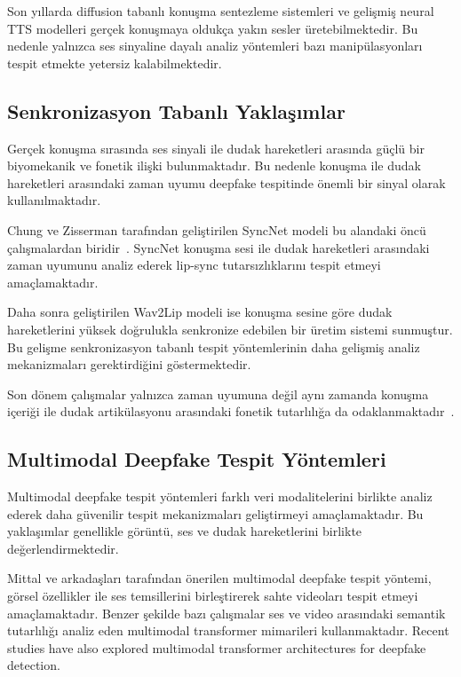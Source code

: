 \documentclass[conference]{IEEEtran}
\begin{document}
Son yıllarda diffusion tabanlı konuşma sentezleme sistemleri ve gelişmiş neural TTS modelleri gerçek konuşmaya oldukça yakın sesler üretebilmektedir. Bu nedenle yalnızca ses sinyaline dayalı analiz yöntemleri bazı manipülasyonları tespit etmekte yetersiz kalabilmektedir.

\subsection{Senkronizasyon Tabanlı Yaklaşımlar}

Gerçek konuşma sırasında ses sinyali ile dudak hareketleri arasında güçlü bir biyomekanik ve fonetik ilişki bulunmaktadır. Bu nedenle konuşma ile dudak hareketleri arasındaki zaman uyumu deepfake tespitinde önemli bir sinyal olarak kullanılmaktadır.

Chung ve Zisserman tarafından geliştirilen SyncNet modeli bu alandaki öncü çalışmalardan biridir~\cite{chung2017voxceleb}. SyncNet konuşma sesi ile dudak hareketleri arasındaki zaman uyumunu analiz ederek lip-sync tutarsızlıklarını tespit etmeyi amaçlamaktadır.

Daha sonra geliştirilen Wav2Lip modeli ise konuşma sesine göre dudak hareketlerini yüksek doğrulukla senkronize edebilen bir üretim sistemi sunmuştur. Bu gelişme senkronizasyon tabanlı tespit yöntemlerinin daha gelişmiş analiz mekanizmaları gerektirdiğini göstermektedir.

Son dönem çalışmalar yalnızca zaman uyumuna değil aynı zamanda konuşma içeriği ile dudak artikülasyonu arasındaki fonetik tutarlılığa da odaklanmaktadır~\cite{tian2024lips}.

\subsection{Multimodal Deepfake Tespit Yöntemleri}

Multimodal deepfake tespit yöntemleri farklı veri modalitelerini birlikte analiz ederek daha güvenilir tespit mekanizmaları geliştirmeyi amaçlamaktadır. Bu yaklaşımlar genellikle görüntü, ses ve dudak hareketlerini birlikte değerlendirmektedir.

Mittal ve arkadaşları tarafından önerilen multimodal deepfake tespit yöntemi, görsel özellikler ile ses temsillerini birleştirerek sahte videoları tespit etmeyi amaçlamaktadır. Benzer şekilde bazı çalışmalar ses ve video arasındaki semantik tutarlılığı analiz eden multimodal transformer mimarileri kullanmaktadır. Recent studies have also explored multimodal transformer architectures for deepfake detection.
\end{document}
